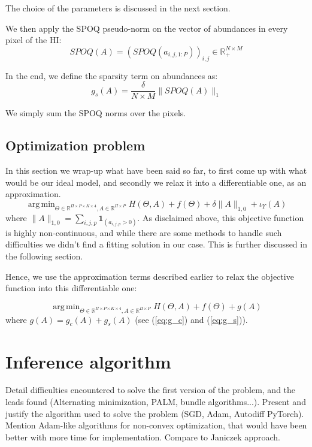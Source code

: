 \documentclass[conference]{IEEEtran}
\DeclareMathOperator*{\argmin}{arg\,min}
\begin{document}
The choice of the parameters is discussed in the next section.

We then apply the SPOQ pseudo-norm on the vector of abundances in every pixel of the HI:
$$SPOQ(A) = (SPOQ(a_{i,j,1:P}))_{i, j} \in \mathbb{R}_+^{N \times M}$$

In the end, we define the sparsity term on abundances as:
\begin{equation}\label{eq:g_s}
  g_s(A) = \frac{\delta}{N \times M} \| SPOQ(A) \|_{1}
\end{equation}

We simply sum the SPOQ norms over the pixels.

\subsection{Optimization problem}
In this section we wrap-up what have been said so far, to first come up with what would be our ideal model, and secondly we relax it into a differentiable one, as an approximation.
\begin{equation}
  \label{eq:ideal}
  \argmin_{\Theta \in \mathbb{R}^{\Pi \times P \times K \times 4}, A \in \mathbb{R}^{\Pi \times P}} H(\Theta, A) + f(\Theta) + \delta \|A\|_{1,0} + \iota_\Upsilon (A)
\end{equation}
where $\|A\|_{1,0} = \sum_{i,j,p} \mathbf{1}_{(a_{i,j,p} > 0)}$. As disclaimed above, this objective function is highly non-continuous, and while there are some methods to handle such difficulties we didn't find a fitting solution in our case. This is further discussed in the following section.

Hence, we use the approximation terms described earlier to relax the objective function into this differentiable one:

\begin{equation}
  \label{eq:general}
  \argmin_{\Theta \in \mathbb{R}^{\Pi \times P \times K \times 4}, A \in \mathbb{R}^{\Pi \times P}} H(\Theta, A) + f(\Theta) + g(A)
\end{equation}
where $g(A) = g_c(A) + g_s(A)$ (see (\ref{eq:g_c}) and (\ref{eq:g_s})).


\section{Inference algorithm}


Detail difficulties encountered to solve the first version of the problem, and the leads found (Alternating minimization, PALM, bundle algorithms...). Present and justify the algorithm used to solve the problem (SGD, Adam, Autodiff PyTorch). Mention Adam-like algorithms for non-convex optimization, that would have been better with more time for implementation. Compare to Janiczek approach.
\end{document}
